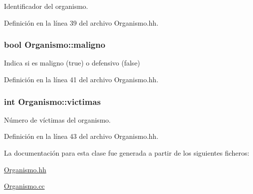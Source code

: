 Identificador del organismo. 



Definición en la línea 39 del archivo Organismo.\+hh.

\subsubsection[{\texorpdfstring{maligno}{maligno}}]{\setlength{\rightskip}{0pt plus 5cm}bool Organismo\+::maligno\hspace{0.3cm}{\ttfamily [private]}}\hypertarget{class_organismo_a85a5d1b9d31fa209d1ed0d596dbbed61}{}\label{class_organismo_a85a5d1b9d31fa209d1ed0d596dbbed61}


Indica si es maligno (true) o defensivo (false) 



Definición en la línea 41 del archivo Organismo.\+hh.

\subsubsection[{\texorpdfstring{victimas}{victimas}}]{\setlength{\rightskip}{0pt plus 5cm}int Organismo\+::victimas\hspace{0.3cm}{\ttfamily [private]}}\hypertarget{class_organismo_abb3e56487a080df544a6ff96e5e42520}{}\label{class_organismo_abb3e56487a080df544a6ff96e5e42520}


Número de víctimas del organismo. 



Definición en la línea 43 del archivo Organismo.\+hh.



La documentación para esta clase fue generada a partir de los siguientes ficheros\+:\begin{DoxyCompactItemize}
\item 
\hyperlink{_organismo_8hh}{Organismo.\+hh}\item 
\hyperlink{_organismo_8cc}{Organismo.\+cc}\end{DoxyCompactItemize}
